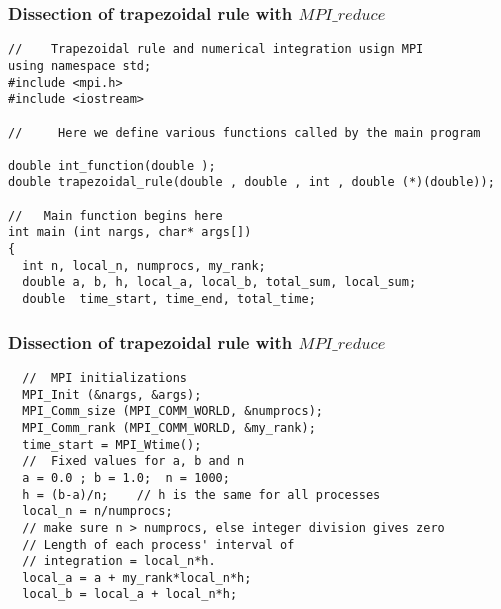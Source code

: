 \documentclass{beamer}
\begin{document}
\begin{frame}
\frametitle{Dissection of trapezoidal rule with $MPI\_reduce$}

\begin{block}{}

\begin{verbatim}
//    Trapezoidal rule and numerical integration usign MPI
using namespace std;
#include <mpi.h>
#include <iostream>

//     Here we define various functions called by the main program

double int_function(double );
double trapezoidal_rule(double , double , int , double (*)(double));

//   Main function begins here
int main (int nargs, char* args[])
{
  int n, local_n, numprocs, my_rank; 
  double a, b, h, local_a, local_b, total_sum, local_sum;   
  double  time_start, time_end, total_time;
\end{verbatim}


\end{block}
\end{frame}

\begin{frame}
\frametitle{Dissection of trapezoidal rule with $MPI\_reduce$}

\begin{block}{}

\begin{verbatim}
  //  MPI initializations
  MPI_Init (&nargs, &args);
  MPI_Comm_size (MPI_COMM_WORLD, &numprocs);
  MPI_Comm_rank (MPI_COMM_WORLD, &my_rank);
  time_start = MPI_Wtime();
  //  Fixed values for a, b and n 
  a = 0.0 ; b = 1.0;  n = 1000;
  h = (b-a)/n;    // h is the same for all processes 
  local_n = n/numprocs;  
  // make sure n > numprocs, else integer division gives zero
  // Length of each process' interval of
  // integration = local_n*h.  
  local_a = a + my_rank*local_n*h;
  local_b = local_a + local_n*h;
\end{verbatim}


\end{block}
\end{frame}
\end{document}

